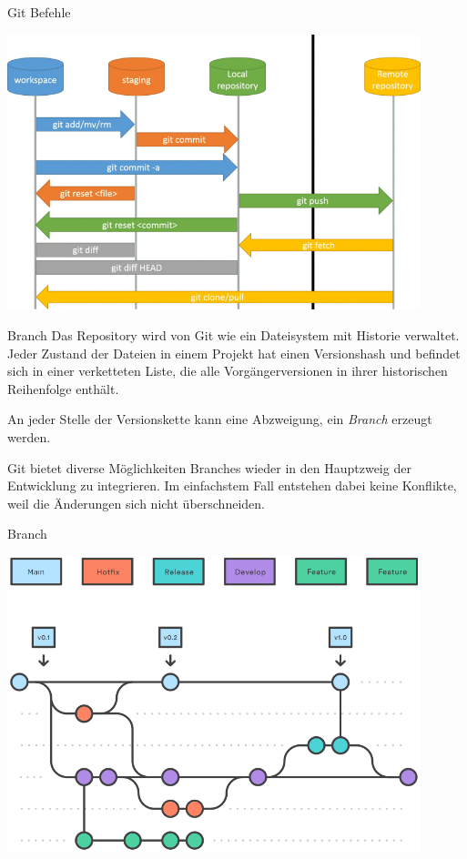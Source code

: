 \begin{bonus}{Git Befehle}
    \begin{center}
        \includegraphics[width=0.9\textwidth]{includes/figures/bonus_git.png}
    \end{center}
\end{bonus}

\begin{defi}{Branch}
    Das Repository wird von Git wie ein Dateisystem mit Historie verwaltet. Jeder Zustand der Dateien in einem Projekt hat einen Versionshash und befindet sich in einer verketteten Liste, die alle Vorgängerversionen in ihrer historischen Reihenfolge enthält.

    An jeder Stelle der Versionskette kann eine Abzweigung, ein \emph{Branch} erzeugt werden.

    Git bietet diverse Möglichkeiten Branches wieder in den Hauptzweig der Entwicklung zu integrieren.
    Im einfachstem Fall entstehen dabei keine Konflikte, weil die Änderungen sich nicht überschneiden.
\end{defi}

\begin{example}{Branch}
    \begin{center}
        \includegraphics[width=0.9\textwidth]{includes/figures/bonus_git_branches.png}
    \end{center}
\end{example}